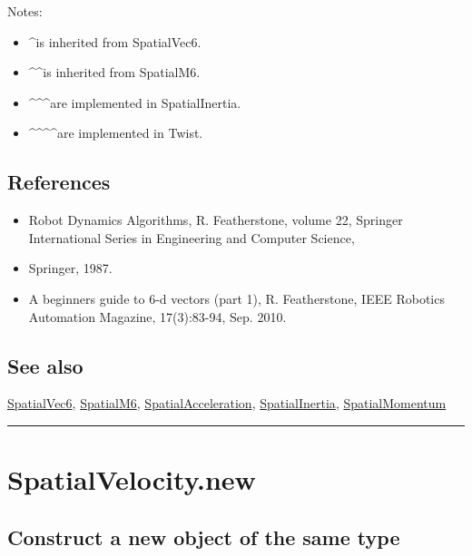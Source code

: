 Notes:

\begin{itemize}
  \item \textasciicircum  is inherited from SpatialVec6.
  \item \textasciicircum\textasciicircum  is inherited from SpatialM6.
  \item \textasciicircum\textasciicircum\textasciicircum  are implemented in SpatialInertia.
  \item \textasciicircum\textasciicircum\textasciicircum\textasciicircum  are implemented in Twist.
\end{itemize}

\subsection*{References}
\begin{itemize}
  \item Robot Dynamics Algorithms, R. Featherstone, volume 22,     Springer International Series in Engineering and Computer Science,
  \item Springer, 1987.
  \item A beginner\textquotesingle s guide to 6-d vectors (part 1), R. Featherstone,     IEEE Robotics Automation Magazine, 17(3):83-94, Sep. 2010.
\end{itemize}

\subsection*{See also}


\hyperlink{SpatialVec6}{\color{blue} SpatialVec6}, \hyperlink{SpatialM6}{\color{blue} SpatialM6}, \hyperlink{SpatialAcceleration}{\color{blue} SpatialAcceleration}, \hyperlink{SpatialInertia}{\color{blue} SpatialInertia}, \hyperlink{SpatialMomentum}{\color{blue} SpatialMomentum}

\vspace{1.5ex}\hrule

\hypertarget{SpatialVelocity.new}{\section*{SpatialVelocity.new}}
\subsection*{Construct a new object of the same type}


